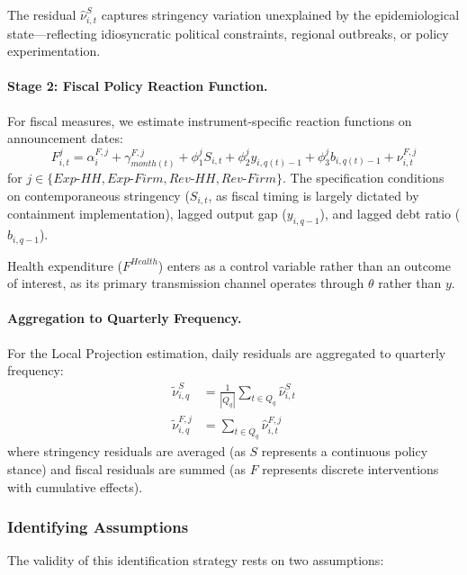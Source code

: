\documentclass[12pt, a4paper]{article}
\begin{document}
The residual $\hat{\nu}^S_{i,t}$ captures stringency variation unexplained by the epidemiological state—reflecting idiosyncratic political constraints, regional outbreaks, or policy experimentation.

\paragraph{Stage 2: Fiscal Policy Reaction Function.} For fiscal measures, we estimate instrument-specific reaction functions on announcement dates:
\begin{equation}
    F^j_{i,t} = \alpha^{F,j}_i + \gamma^{F,j}_{month(t)} + \phi^j_1 S_{i,t} + \phi^j_2 y_{i,q(t)-1} + \phi^j_3 b_{i,q(t)-1} + \nu^{F,j}_{i,t}
    \label{eq:reaction_F}
\end{equation}
for $j \in \{Exp\text{-}HH, Exp\text{-}Firm, Rev\text{-}HH, Rev\text{-}Firm\}$. The specification conditions on contemporaneous stringency ($S_{i,t}$, as fiscal timing is largely dictated by containment implementation), lagged output gap ($y_{i,q-1}$), and lagged debt ratio ($b_{i,q-1}$).

Health expenditure ($F^{Health}$) enters as a control variable rather than an outcome of interest, as its primary transmission channel operates through $\theta$ rather than $y$.

\paragraph{Aggregation to Quarterly Frequency.} For the Local Projection estimation, daily residuals are aggregated to quarterly frequency:
\begin{align}
    \tilde{\nu}^S_{i,q} &= \frac{1}{|Q_q|} \sum_{t \in Q_q} \hat{\nu}^S_{i,t} \\
    \tilde{\nu}^{F,j}_{i,q} &= \sum_{t \in Q_q} \hat{\nu}^{F,j}_{i,t}
\end{align}
where stringency residuals are averaged (as $S$ represents a continuous policy stance) and fiscal residuals are summed (as $F$ represents discrete interventions with cumulative effects).

\subsubsection{Identifying Assumptions}

The validity of this identification strategy rests on two assumptions:
\end{document}
